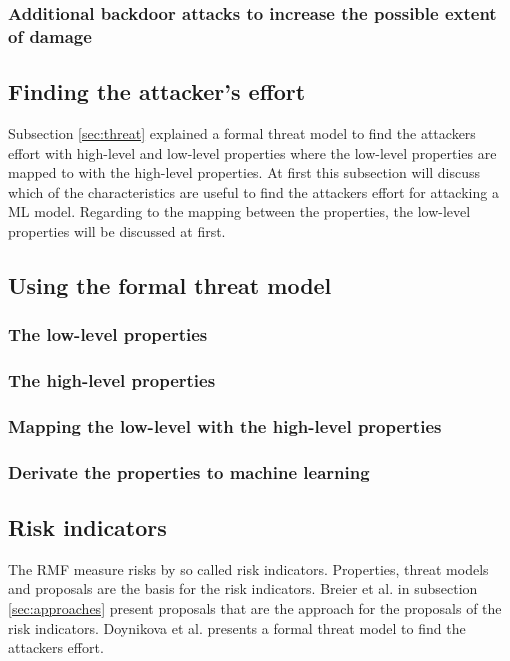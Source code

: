 \subsubsection*{Additional backdoor attacks to increase the possible extent of damage}


\subsection{Finding the attacker's effort}

Subsection \ref{sec:threat} explained a formal threat model to find the attackers effort with high-level and low-level properties where the low-level properties are mapped to with the high-level properties. At first this subsection will discuss which of the characteristics are useful to find the attackers effort for attacking a ML model. Regarding to the mapping between the properties, the low-level properties will be discussed at first.

\subsection{Using the formal threat model}


\subsubsection*{The low-level properties}


\subsubsection*{The high-level properties}

\subsubsection*{Mapping the low-level with the high-level properties}


\subsubsection*{Derivate the properties to machine learning}


\subsection{Risk indicators}
\label{sec:risk_indicators}

The RMF measure risks by so called risk indicators. Properties, threat models and proposals are the basis for the risk indicators. Breier et al. in subsection \ref{sec:approaches} present
proposals that are the approach for the proposals of the risk indicators. Doynikova et al. presents a formal threat model to find the attackers effort.

